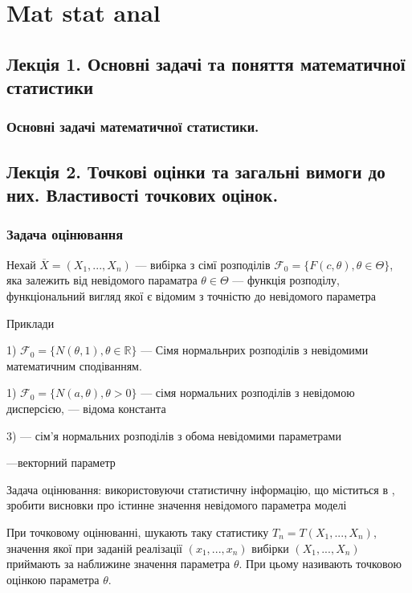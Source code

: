 \chapter{Mat stat anal}

\section{Лекція 1. Основні задачі та поняття математичної статистики}

\subsection{Основні задачі математичної статистики.}

\section{Лекція 2. Точкові оцінки та загальні вимоги до них. Властивості точкових оцінок.}

\subsection{Задача оцінювання}

Нехай $\overline{X} = (X_1, ..., X_n)$ --- вибірка з сімї розподілів
$\mathcal{F}_0 = \{ F(c, \theta), \theta \in \Theta \}$, яка залежить від
невідомого параматра $\theta \in \Theta$  --- функція розподілу, функціональний вигляд якої є відомим
з точністю до невідомого параметра


Приклади

1) $\mathcal{F}_0 = \{ N(\theta, 1), \theta \in \mathbb{R} \}$
--- Сімя нормальнрих розподілів з невідомими математичним сподіванням.

1) $\mathcal{F}_0 = \{ N(a, \theta), \theta > 0 \}$ --- сімя нормальних розподілів з невідомою
дисперсією, --- відома константа

3) --- сім'я нормальних розподілів з обома невідомими параметрами


---векторний параметр


Задача оцінювання: використовуючи статистичну інформацію,
що міститься в  , зробити висновки про істинне значення  невідомого параметра моделі

При точковому оцінюванні, шукають таку статистику $T_n = T(X_1, ..., X_n)$,
значення якої при заданій реалізації $(x_1, ..., x_n)$ вибірки $(X_1, ..., X_n)$
приймають за наближине значення параметра $\theta$. При цьому  називають
точковою оцінкою параметра $\theta$.

